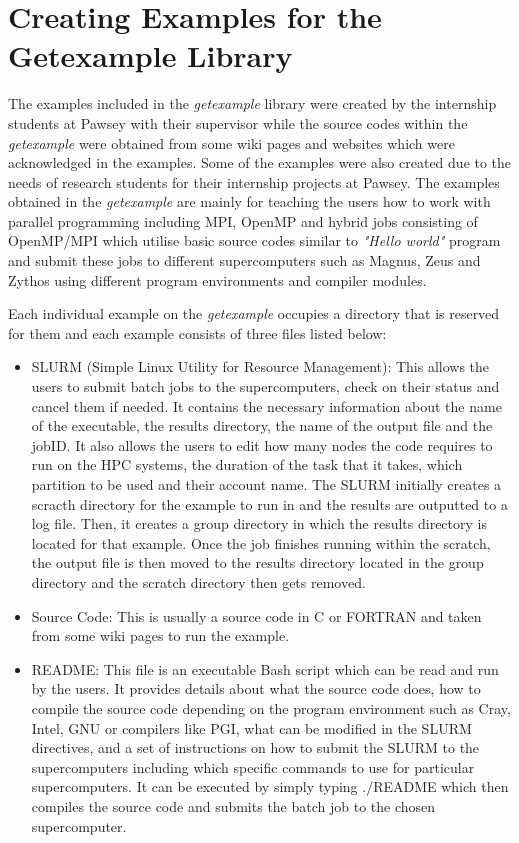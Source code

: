 \section{Creating Examples for the Getexample Library}

The examples included in the \emph{getexample} library were created by the internship students at Pawsey with their supervisor while the source codes within the
\emph{getexample} were obtained from some wiki pages and websites which were acknowledged in the examples. Some of the examples were also created due to the
needs of research students for their internship projects at Pawsey. The examples obtained in the \emph{getexample} are mainly for teaching the users how to work
with parallel programming including MPI, OpenMP and hybrid jobs consisting of OpenMP/MPI which utilise basic source codes similar to \emph{"Hello world"} 
program and submit these jobs to different supercomputers such as Magnus, Zeus and Zythos using different program environments and compiler modules. 

Each individual example on the \emph{getexample} occupies a directory that is reserved for them and each example consists of three files listed below:

\begin{itemize}    
\item SLURM (Simple Linux Utility for Resource Management): This allows the users to submit batch jobs to the supercomputers, check on their status and 
cancel them if needed. It contains the necessary information about the name of the executable, the results directory, the name of the output file and 
the jobID. It also allows the users to edit how many nodes the code requires to run on the HPC systems, the duration of the task that it takes, which 
partition to be used and their account name. The SLURM initially creates a scracth directory for the example to run in and the results are outputted to 
a log file. Then, it creates a group directory in which the results directory is located for that example. Once the job finishes running within the 
scratch, the output file is then moved to the results directory located in the group directory and the scratch directory then gets removed.
\item Source Code: This is usually a source code in C or FORTRAN and taken from some wiki pages to run the example.
\item README: This file is an executable Bash script which can be read and run by the users. It provides details about what the source code does,
how to compile the source code depending on the program environment such as Cray, Intel, GNU or compilers like PGI, what can be modified in the SLURM 
directives, and a set of instructions on how to submit the SLURM to the supercomputers including which specific commands to use for particular 
supercomputers. It can be executed by simply typing ./README which then compiles the source code and submits the batch job to the chosen supercomputer.
\end{itemize}

